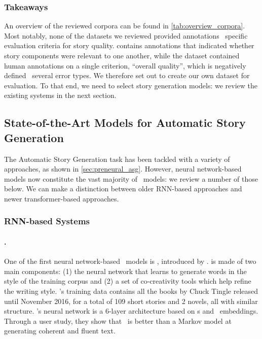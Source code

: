 \subsubsection{Takeaways}
An overview of the reviewed corpora can be found in \autoref{tab:overview_corpora}. Most notably, none of the datasets we reviewed provided annotations {\wrt}\ specific evaluation criteria for story quality. {\storium} contains annotations that indicated whether story components were relevant to one another, while the {\openmeva} dataset \citep{guan2021openmeva} contained human annotations on a single criterion, ``overall quality'', which is negatively defined {\wrt}\ several error types. We therefore set out to create our own dataset for {\asg} evaluation. To that end, we need to select story generation models: we review the existing {\asg} systems in the next section.

\subsection{State-of-the-Art Models for Automatic Story Generation}
\label{sub:neural_asg}

The Automatic Story Generation task has been tackled with a variety of approaches, as shown in \autoref{sec:preneural_asg}. However, neural network-based models now constitute the vast majority of \asg\ models: we review a number of those below. We can make a distinction between older RNN-based approaches and newer transformer-based approaches.

\subsubsection{RNN-based {\asg} Systems}

\paragraph{\tingle.}
One of the first neural network-based \asg\ models is \tingle, introduced by \citet{khalifa2017deeptingle}. {\tingle} is made of two main components: (1) the neural network that learns to generate words in the style of the training corpus and (2) a set of co-creativity tools which help refine the writing style. {\tingle}'s training data contains all the books by Chuck Tingle released until November 2016, for a total of 109 short stories and 2 novels, all with similar structure. \tingle 's neural network is a 6-layer architecture based on {\lstm}s and \glove\ embeddings. Through a user study, they show that \tingle\ is better than a Markov model at generating coherent and fluent text.

